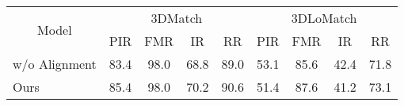 \begin{table}[H]
    \renewcommand{\arraystretch}{1}
    \centering
    \label{tab:4-5}
    \wuhao

    \begin{tabular}{lcccccccc}
    \toprule[1.5pt]
    \multicolumn{1}{c}{\multirow{2}{*}{Model}}
    & \multicolumn{4}{c}{3DMatch}
    & \multicolumn{4}{c}{3DLoMatch}
    \\ \multicolumn{1}{c}{}
    
    & PIR   & FMR   & IR   & RR   & PIR   & FMR   & IR    & RR
    \\ \hline
    w/o Alignment
    & 83.4  & 98.0  & 68.8 & 89.0 & 53.1  & 85.6  & 42.4  & 71.8  \\
    Ours
    & 85.4  & 98.0  & 70.2 & 90.6 & 51.4  & 87.6  & 41.2  & 73.1  \\
    \bottomrule[1.5pt]
    \end{tabular}
\end{table}